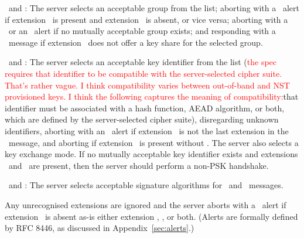 \begin{description}

\item \TLSsupportedGroups\ and \TLSkeyShare: The server selects an acceptable group 
  from the list; aborting with a \TLSmissingExtension\ alert if extension \TLSsupportedGroups\ 
  is present and extension \TLSkeyShare\ is absent, or vice versa; aborting with a 
  \TLShandshakeFailure\ or an \TLSinsufficientSecurity\ alert if no mutually acceptable 
  group exists; and \label{comp:CH:cons:HRR} responding with a \HelloRetryRequest\ 
  message if extension \TLSkeyShare\ does not offer a key share for the selected group.

\item \TLSpsk\ and \TLSpskModes: The server selects an acceptable key identifier
  from the list (\ifSpecNotes\textcolor{red}{the spec requires that identifier to be compatible 
  with the server-selected cipher suite. That's rather vague. I think compatibility varies 
  between out-of-band and NST provisioned keys. I think the following captures the meaning 
  of compatibility:}\fi{}that identifier must be associated with a hash function, 
  AEAD algorithm, or both, which are defined by the server-selected cipher suite), 
  disregarding unknown identifiers, aborting with an \TLSillegalParameter\ 
  alert if extension \TLSpsk\ is not the last extension in the \ClientHello\ message,
  and aborting if extension \TLSpsk\ is present without \TLSpskModes.
  The server also selects a key exchange mode.\label{comp:CH:cons:psk}
  If no mutually acceptable key identifier exists and extensions \TLSsupportedGroups\ 
  and \TLSkeyShare\ are present, then the server should perform a non-PSK handshake.
  

\item \TLSsignatureAlgorithms\ and \TLSsignatureAlgorithmsCert:
  The server selects acceptable signature algorithms for \CertificateVerify\ 
  and \Certificate\ messages.

\end{description}

\noindent
Any unrecognised extensions are ignored and the server aborts with a 
\TLSmissingExtension\ alert if extension \TLSpsk\ is absent as-is
either extension \TLSsupportedGroups, \TLSsignatureAlgorithms, or 
both. (Alerts are formally defined by RFC 8446, as 
discussed in Appendix~\ref{sec:alerts}.)

